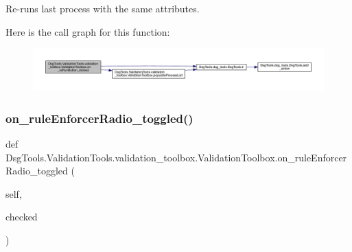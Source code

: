 \begin{DoxyVerb}Re-runs last process with the same attributes.
\end{DoxyVerb}
 Here is the call graph for this function\+:
\nopagebreak
\begin{figure}[H]
\begin{center}
\leavevmode
\includegraphics[width=350pt]{class_dsg_tools_1_1_validation_tools_1_1validation__toolbox_1_1_validation_toolbox_a2ea4455fafc4a0320247fc7bedc365d0_cgraph}
\end{center}
\end{figure}
\mbox{\label{class_dsg_tools_1_1_validation_tools_1_1validation__toolbox_1_1_validation_toolbox_ae5b900e85a52452c3736f6f380e57d17}} 
\subsubsection{\texorpdfstring{on\+\_\+rule\+Enforcer\+Radio\+\_\+toggled()}{on\_ruleEnforcerRadio\_toggled()}}
{\footnotesize\ttfamily def Dsg\+Tools.\+Validation\+Tools.\+validation\+\_\+toolbox.\+Validation\+Toolbox.\+on\+\_\+rule\+Enforcer\+Radio\+\_\+toggled (\begin{DoxyParamCaption}\item[{}]{self,  }\item[{}]{checked }\end{DoxyParamCaption})}

